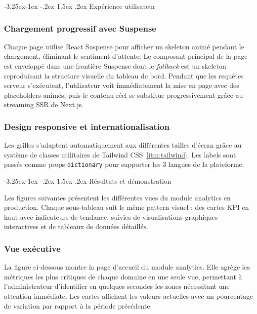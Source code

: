 \documentclass[12pt,a4paper,openany]{report}
\makeatletter
\renewcommand\subsection{\@startsection{subsection}{2}{\z@}%
  {-3.25ex\@plus -1ex \@minus -.2ex}%
  {1.5ex \@plus .2ex}%
  {\needspace{8\baselineskip}\normalfont\large\bfseries\color{primary!80!black}}}
\newcommand{\code}[1]{\texttt{#1}}
\makeatother
\begin{document}
\subsection{Expérience utilisateur}

\subsubsection{Chargement progressif avec Suspense}

Chaque page utilise React Suspense pour afficher un skeleton animé pendant le chargement, éliminant le sentiment d'attente. Le composant principal de la page est enveloppé dans une frontière Suspense dont le \textit{fallback} est un skeleton reproduisant la structure visuelle du tableau de bord. Pendant que les requêtes serveur s'exécutent, l'utilisateur voit immédiatement la mise en page avec des placeholders animés, puis le contenu réel se substitue progressivement grâce au streaming SSR de Next.js.

\subsubsection{Design responsive et internationalisation}

Les grilles s'adaptent automatiquement aux différentes tailles d'écran grâce au système de classes utilitaires de Tailwind CSS~\ref{itm:tailwind}. Les labels sont passés comme props \code{dictionary} pour supporter les 3 langues de la plateforme.

\subsection{Résultats et démonstration}

Les figures suivantes présentent les différentes vues du module analytics en production. Chaque sous-tableau suit le même pattern visuel : des cartes KPI en haut avec indicateurs de tendance, suivies de visualisations graphiques interactives et de tableaux de données détaillés.

\subsubsection{Vue exécutive}

La figure ci-dessous montre la page d'accueil du module analytics. Elle agrège les métriques les plus critiques de chaque domaine en une seule vue, permettant à l'administrateur d'identifier en quelques secondes les zones nécessitant une attention immédiate. Les cartes affichent les valeurs actuelles avec un pourcentage de variation par rapport à la période précédente.
\end{document}
